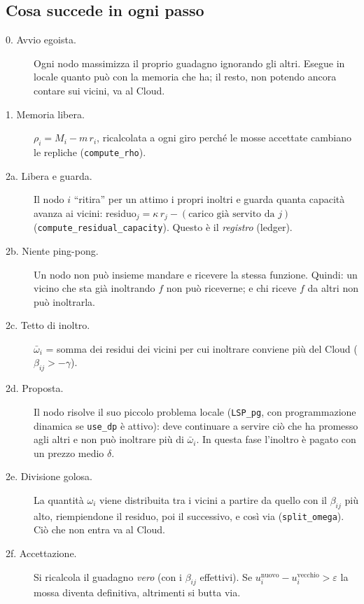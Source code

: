\documentclass[11pt,a4paper]{article}
\newcommand{\code}[1]{\texttt{#1}}
\begin{document}
\subsection*{Cosa succede in ogni passo}

\begin{description}
\item[0. Avvio egoista.] Ogni nodo massimizza il proprio guadagno ignorando
  gli altri. Esegue in locale quanto pu\`o con la memoria che ha; il resto,
  non potendo ancora contare sui vicini, va al Cloud.

\item[1. Memoria libera.] $\rho_i = M_i - m\,r_i$, ricalcolata a ogni giro
  perch\'e le mosse accettate cambiano le repliche (\code{compute\_rho}).

\item[2a. Libera e guarda.] Il nodo $i$ ``ritira'' per un attimo i propri
  inoltri e guarda quanta capacit\`a avanza ai vicini:
  residuo$_j = \kappa\,r_j - (\text{carico gi\`a servito da } j)$
  (\code{compute\_residual\_capacity}). Questo \`e il \emph{registro} (ledger).

\item[2b. Niente ping-pong.] Un nodo non pu\`o insieme mandare e ricevere la
  stessa funzione. Quindi: un vicino che sta gi\`a inoltrando $f$ non pu\`o
  riceverne; e chi riceve $f$ da altri non pu\`o inoltrarla.

\item[2c. Tetto di inoltro.] $\bar\omega_i$ = somma dei residui dei vicini
  per cui inoltrare conviene pi\`u del Cloud ($\beta_{ij} > -\gamma$).

\item[2d. Proposta.] Il nodo risolve il suo piccolo problema locale
  (\code{LSP\_pg}, con programmazione dinamica se \code{use\_dp} \`e attivo):
  deve continuare a servire ci\`o che ha promesso agli altri e non pu\`o
  inoltrare pi\`u di $\bar\omega_i$. In questa fase l'inoltro \`e pagato con un
  prezzo medio $\delta$.

\item[2e. Divisione golosa.] La quantit\`a $\omega_i$ viene distribuita tra i
  vicini a partire da quello con il $\beta_{ij}$ pi\`u alto, riempiendone il
  residuo, poi il successivo, e cos\`i via (\code{split\_omega}). Ci\`o che
  non entra va al Cloud.

\item[2f. Accettazione.] Si ricalcola il guadagno \emph{vero} (con i
  $\beta_{ij}$ effettivi). Se $u_i^{\text{nuovo}} - u_i^{\text{vecchio}} > \varepsilon$
  la mossa diventa definitiva, altrimenti si butta via.


\end{description}
\end{document}
